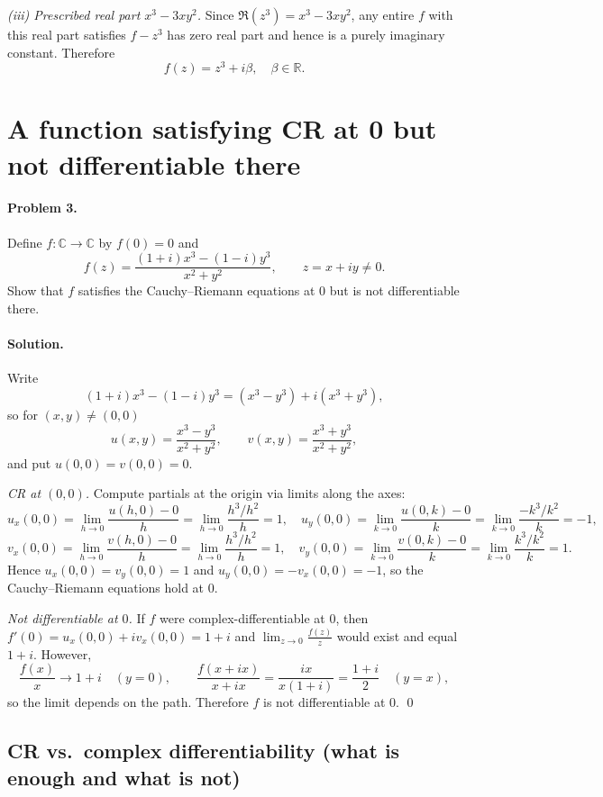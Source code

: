 \documentclass[11pt,a4paper]{article}
\theoremstyle{definition}
\theoremstyle{definition}
\theoremstyle{plain}
\theoremstyle{remark}
\begin{document}
\medskip
\emph{(iii) Prescribed real part $x^3-3xy^2$.}
Since $\Re(z^3)=x^3-3xy^2$, any entire $f$ with this real part satisfies $f-z^3$ has zero real part and hence is a purely imaginary constant. Therefore
\[
\boxed{\,f(z)=z^3+i\beta,\quad \beta\in\mathbb R.\,}
\]

\section*{A function satisfying CR at 0 but not differentiable there}

\paragraph{Problem 3.}
Define $f:\mathbb C\to\mathbb C$ by $f(0)=0$ and
\[
f(z)=\frac{(1+i)x^{3}-(1-i)y^{3}}{x^{2}+y^{2}},\qquad z=x+iy\ne0.
\]
Show that $f$ satisfies the Cauchy--Riemann equations at $0$ but is not differentiable there.

\paragraph{Solution.}
Write
\[
(1+i)x^3-(1-i)y^3=(x^3-y^3)+i(x^3+y^3),
\]
so for $(x,y)\neq(0,0)$
\[
u(x,y)=\frac{x^3-y^3}{x^2+y^2},\qquad
v(x,y)=\frac{x^3+y^3}{x^2+y^2},
\]
and put $u(0,0)=v(0,0)=0$.

\emph{CR at $(0,0)$.}
Compute partials at the origin via limits along the axes:
\[
u_x(0,0)=\lim_{h\to0}\frac{u(h,0)-0}{h}
=\lim_{h\to0}\frac{h^3/h^2}{h}=1,\quad
u_y(0,0)=\lim_{k\to0}\frac{u(0,k)-0}{k}
=\lim_{k\to0}\frac{-k^3/k^2}{k}=-1,
\]
\[
v_x(0,0)=\lim_{h\to0}\frac{v(h,0)-0}{h}
=\lim_{h\to0}\frac{h^3/h^2}{h}=1,\quad
v_y(0,0)=\lim_{k\to0}\frac{v(0,k)-0}{k}
=\lim_{k\to0}\frac{k^3/k^2}{k}=1.
\]
Hence $u_x(0,0)=v_y(0,0)=1$ and $u_y(0,0)=-v_x(0,0)=-1$, so the Cauchy--Riemann equations hold at $0$.

\emph{Not differentiable at $0$.}
If $f$ were complex-differentiable at 0, then $f'(0)=u_x(0,0)+i v_x(0,0)=1+i$ and
$\displaystyle \lim_{z\to0}\frac{f(z)}{z}$ would exist and equal $1+i$.
However,
\[
\frac{f(x)}{x}\to 1+i\quad(y=0),\qquad
\frac{f(x+ix)}{x+ix}=\frac{i x}{x(1+i)}=\frac{1+i}{2}\quad(y=x),
\]
so the limit depends on the path. Therefore $f$ is not differentiable at $0$.
\qed

\subsection*{CR vs.\ complex differentiability (what is enough and what is not)}
\end{document}
